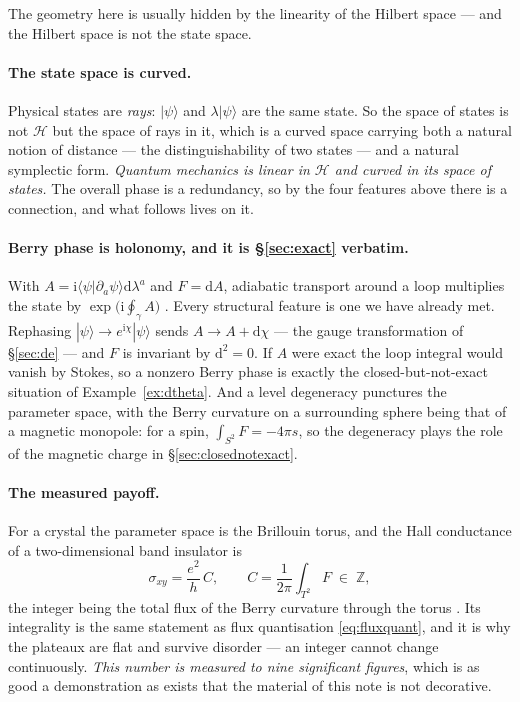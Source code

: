 \documentclass[10pt,a4paper]{article}
\newcommand{\dd}{\mathrm{d}}
\newcommand{\Z}{\mathbb{Z}}
\theoremstyle{plain}
\theoremstyle{definition}
\numberwithin{equation}{section}
\begin{document}
The geometry here is usually hidden by the linearity of the Hilbert space --- and the Hilbert
space is not the state space.

\paragraph{The state space is curved.} Physical states are \emph{rays}: $|\psi\rangle$ and
$\lambda|\psi\rangle$ are the same state. So the space of states is not $\mathcal H$ but the
space of rays in it, which is a curved space carrying both a natural notion of distance ---
the distinguishability of two states --- and a natural symplectic form. \emph{Quantum mechanics
is linear in $\mathcal H$ and curved in its space of states.} The overall phase is a
redundancy, so by the four features above there is a connection, and what follows lives on
it.

\paragraph{Berry phase is holonomy, and it is \S\ref{sec:exact} verbatim.} With
$A=\mathrm i\langle\psi|\partial_a\psi\rangle\dd\lambda^a$ and $F=\dd A$, adiabatic transport
around a loop multiplies the state by $\exp\big(\mathrm i\oint_\gamma A\big)$ \cite{Berry}.
Every structural feature is one we have already met. Rephasing $|\psi\rangle\to
e^{\mathrm i\chi}|\psi\rangle$ sends $A\to A+\dd\chi$ --- the gauge transformation of
\S\ref{sec:de} --- and $F$ is invariant by $\dd^2=0$. If $A$ were exact the loop integral would
vanish by Stokes, so a nonzero Berry phase is exactly the closed-but-not-exact situation of
Example~\ref{ex:dtheta}. And a level degeneracy punctures the parameter space, with the Berry
curvature on a surrounding sphere being that of a magnetic monopole: for a spin,
$\int_{S^2}F=-4\pi s$, so the degeneracy plays the role of the magnetic charge in
\S\ref{sec:closednotexact}.

\paragraph{The measured payoff.} For a crystal the parameter space is the Brillouin torus, and
the Hall conductance of a two-dimensional band insulator is
\begin{equation}
\sigma_{xy}=\frac{e^2}{h}\,C,\qquad C=\frac1{2\pi}\int_{T^2}F\;\in\;\Z ,
\label{eq:tknn}
\end{equation}
the integer being the total flux of the Berry curvature through the torus \cite{TKNN}. Its
integrality is the same statement as flux quantisation \eqref{eq:fluxquant}, and it is why the
plateaux are flat and survive disorder --- an integer cannot change continuously. \emph{This
number is measured to nine significant figures}, which is as good a demonstration as exists that
the material of this note is not decorative.
\end{document}
